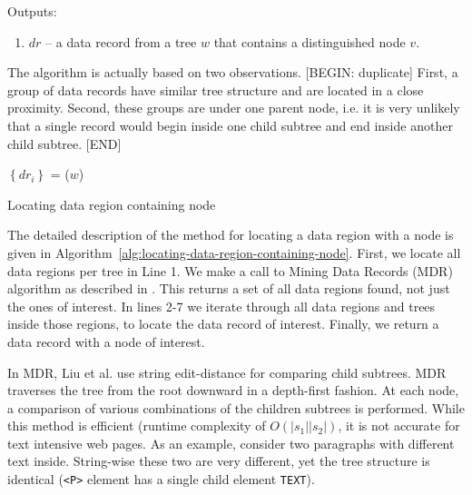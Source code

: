 Outputs: 

\begin{enumerate}
	\item $dr$ -- a data record from a tree $w$ that contains a distinguished node $v$.
\end{enumerate}

The algorithm is actually based on two observations. [BEGIN: duplicate] First, a group of data records have similar tree structure and are located in a close proximity. Second, these groups are under one parent node, i.e. it is very unlikely that a single record would begin inside one child subtree and end inside another child subtree. [END]


\IncMargin{2em}
\begin{algorithm}[h]

	\DontPrintSemicolon

	\BlankLine

	$\left\{dr_i\right\}$ = \MDR($w$) \;
	 {
		 {
		}
	}

	\caption{Locating data region containing node}
	\label{alg:locating-data-region-containing-node}

\end{algorithm}
\DecMargin{2em}

The detailed description of the method for locating a data region with a node is given in Algorithm~\ref{alg:locating-data-region-containing-node}. First, we locate all data regions per tree in Line 1. We make a call to Mining Data Records (MDR) algorithm as described in \cite{liu2009a}. This returns a set of all data regions found, not just the ones of interest. In lines 2-7 we iterate through all data regions and trees inside those regions, to locate the data record of interest. Finally, we return a data record with a node of interest.

In MDR, Liu et al. \cite{liu2009a} use string edit-distance for comparing child subtrees. MDR traverses the tree from the root downward in a depth-first fashion. At each node, a  comparison of various combinations of the children subtrees is performed. While this method is efficient (runtime complexity of $O(|s_1||s_2|)$, it is not accurate for text intensive web pages. As an example, consider two paragraphs with different text inside. String-wise these two are very different, yet the tree structure is identical (\texttt{<P>} element has a single child element \texttt{TEXT}).

